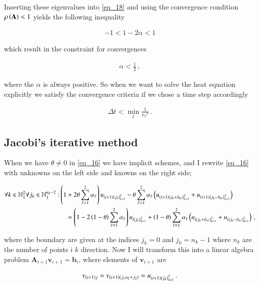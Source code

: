 \documentclass[11pt,english,a4paper]{article}
\begin{document}
\begin{flushleft}
Inserting these eigenvalues into \eqref{eq_18} and using the convergence condition $\rho\left({\textbf{A}}\right) < 1$ yields the following inequality

\begin{align*}
-1 < 1 - 2\alpha < 1
\end{align*}

which result in the constraint for convergences

\begin{align*}
\alpha < \frac{1}{2} \,,
\end{align*}

where the $\alpha$ is always positive. So when we want to solve the heat equation explicitly we satisfy the convergence criteria if we chose a time step accordingly

\begin{align}
\Delta t < \min_\ell \frac{1}{{n_\ell}^2} \,.
\label{eq_21}
\end{align}

\subsection{Jacobi's iterative method}

When we have $\theta\neq 0$ in \eqref{eq_16} we have implicit schemes, and I rewrite \eqref{eq_16} with unknowns on the left side and knowns on the right side;

\begin{align*}
\forall k\in\mathbb{N}_1^2 \forall j_k \in \mathbb{N}_1^{n_k-2} : &\left({1+2\theta\sum_{\ell=1}^2 \alpha_\ell}\right) u_{(i+1)\left\lbrace{j_k}\right\rbrace_{k=1}^2} - \theta\sum_{\ell = 1}^2\alpha_\ell \left({u_{(i+1)\left\lbrace{j_k+\delta_{k\ell}}\right\rbrace_{k=1}^2} + u_{(i+1)\left\lbrace{j_k-\delta_{k\ell}}\right\rbrace_{k=1}^2}}\right) 
\\
&\quad = \left({1-2\left({1-\theta}\right)\sum_{\ell = 1}^2 \alpha_\ell}\right) u_{i\left\lbrace{j_k}\right\rbrace_{k=1}^2} + \left({1-\theta}\right)\sum_{\ell=1}^2\alpha_\ell\left({u_{i\left\lbrace{j_k+\delta_{k\ell}}\right\rbrace_{k=1}^2} + u_{i\left\lbrace{j_k-\delta_{k\ell}}\right\rbrace_{k=1}^2}}\right) \,,
\end{align*}

where the boundary are given at the indices $j_k=0$ and $j_k= n_k-1$ where $n_k$ are the number of points i $k$ direction. Now I will transform this into a linear algebra problem $\textbf{A}_{i+1}\textbf{v}_{i+1} = \textbf{b}_i$, where elements of $\textbf{v}_{i+1}$ are

\begin{align}
v_{(i+1)j} = v_{(i+1)(j_1 n_2 + j_2)} = u_{(i+1)\left\lbrace{j_k}\right\rbrace_{k=1}^2} \,.
\label{eq_22}
\end{align}


\end{flushleft}
\end{document}
